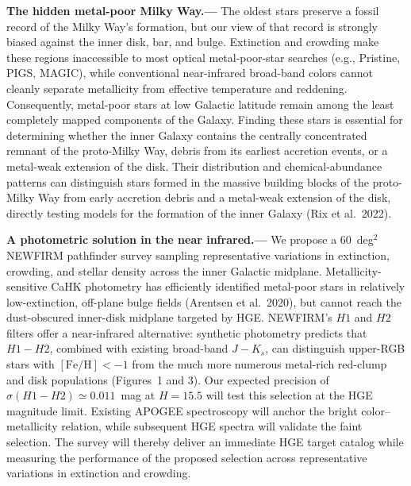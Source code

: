\documentclass[11pt]{article}
\begin{document}
\sciencejustification


\noindent\textbf{The hidden metal-poor Milky Way.---}
The oldest stars preserve a fossil record of the Milky Way's formation, but our
view of that record is strongly biased against the inner disk, bar, and bulge.
Extinction and crowding make these regions inaccessible to most optical
metal-poor-star searches (e.g., Pristine, PIGS, MAGIC), while conventional near-infrared
broad-band colors
cannot cleanly separate metallicity from effective temperature and reddening.
Consequently, metal-poor stars at low Galactic latitude remain among the least
completely mapped components of the Galaxy. Finding these stars is essential
for determining whether the inner Galaxy contains the centrally concentrated
remnant of the proto-Milky Way, debris from its earliest accretion events, or a
metal-weak extension of the disk.
Their distribution and chemical-abundance patterns can distinguish stars
formed in the massive building blocks of the proto-Milky Way from early
accretion debris and a metal-weak extension of the disk, directly testing
models for the formation of the inner Galaxy (Rix et al.\ 2022).

\smallskip
\noindent\textbf{A photometric solution in the near infrared.---}
We propose a 60~deg$^2$ NEWFIRM pathfinder survey sampling representative variations in extinction, crowding, and stellar density across the inner Galactic midplane. 
Metallicity-sensitive CaHK photometry has efficiently identified metal-poor stars in relatively low-extinction, off-plane bulge fields (Arentsen et al.\ 2020), but cannot reach the dust-obscured inner-disk midplane targeted by HGE.
NEWFIRM's $H1$ and $H2$ filters offer a near-infrared alternative: synthetic photometry predicts that $H1-H2$, combined with existing broad-band $J-K_s$, can distinguish upper-RGB stars with $[\mathrm{Fe/H}]<-1$ from the much more numerous metal-rich red-clump and disk populations (Figures~1 and 3).
Our expected precision of $\sigma(H1-H2)\simeq0.011$~mag at $H=15.5$ will test this selection at the HGE magnitude limit.
Existing APOGEE spectroscopy will anchor the bright color--metallicity relation, while subsequent HGE spectra will validate the faint selection. The survey will thereby deliver an immediate HGE target catalog while measuring the performance of the proposed selection across representative variations in extinction and crowding.
\end{document}
